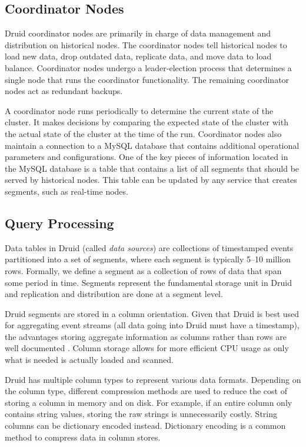 \documentclass{vldb}
\begin{document}
\subsection{Coordinator Nodes}
Druid coordinator nodes are primarily in charge of data management and
distribution on historical nodes. The coordinator nodes tell historical nodes
to load new data, drop outdated data, replicate data, and move data to load
balance. Coordinator nodes undergo a
leader-election process that determines a single node that runs the coordinator
functionality. The remaining coordinator nodes act as redundant backups.

A coordinator node runs periodically to determine the current state of the
cluster. It makes decisions by comparing the expected state of the cluster with
the actual state of the cluster at the time of the run.  Coordinator nodes also
maintain a connection to a MySQL database that contains additional operational
parameters and configurations.  One of the key pieces of information located in
the MySQL database is a table that contains a list of all segments that should
be served by historical nodes.  This table can be updated by any service that
creates segments, such as real-time nodes. 

\subsection{Query Processing}
Data tables in Druid (called \emph{data sources}) are collections of
timestamped events partitioned into a set of segments, where each segment
is typically 5--10 million rows. Formally, we define a segment as a collection
of rows of data that span some period in time. Segments represent the
fundamental storage unit in Druid and replication and distribution are done at
a segment level.

Druid segments are stored in a column orientation. Given that Druid is best
used for aggregating event streams (all data going into Druid must have a
timestamp), the advantages storing aggregate information as columns rather than
rows are well documented \cite{abadi2008column}. Column storage allows for more
efficient CPU usage as only what is needed is actually loaded and scanned. 

Druid has multiple column types to represent various data formats. Depending on
the column type, different compression methods are used to reduce the cost of
storing a column in memory and on disk. For example, if an entire column only
contains string values, storing the raw strings is unnecessarily costly.
String columns can be dictionary encoded instead. Dictionary encoding is a
common method to compress data in column stores.
\end{document}
